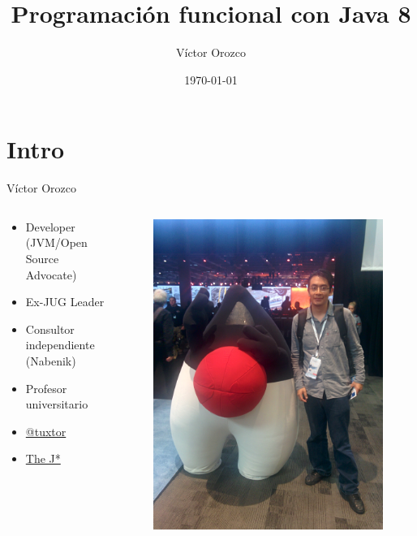 \documentclass{beamer}
\title{Programación funcional con Java 8}
\author{Víctor Orozco}
\institute{Nabenik}
\date{\today}
\begin{document}
\frame{\titlepage}

\section{Intro}


\begin{frame}{Víctor Orozco}
     \begin{columns}[T] %
	     \begin{column}[T]{5cm} %
				\begin{itemize}
				\item Developer (JVM/Open Source Advocate)
				\item Ex-JUG Leader
				\item Consultor independiente (Nabenik)
				\item Profesor universitario
				\item \href{https://twitter.com/tuxtor}{@tuxtor}
				\item \href{http://vorozco.com}{The J*} 
				\end{itemize}
	     \end{column}
	     \begin{column}[T]{5cm} %
			\begin{figure}
			\centering
			\includegraphics[width=0.7\linewidth]{Images/j1.jpg}
			\end{figure}

	     \end{column}
     \end{columns}
\end{frame}
\end{document}
